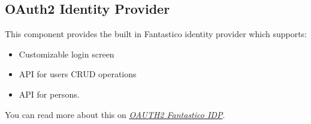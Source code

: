 \documentclass[letterpaper,10pt,english]{sphinxmanual}
\begin{document}
\subsection{OAuth2 Identity Provider}
\label{features/components/oauth2/oauth2_idp/index::doc}\label{features/components/oauth2/oauth2_idp/index:oauth2-identity-provider}
This component provides the built in Fantastico identity provider which supports:
\begin{itemize}
\item {} 
Customizable login screen

\item {} 
API for users CRUD operations

\item {} 
API for persons.

\end{itemize}

You can read more about this on {\hyperref[features/oauth2/idp::doc]{\emph{OAUTH2 Fantastico IDP}}}.
\end{document}
